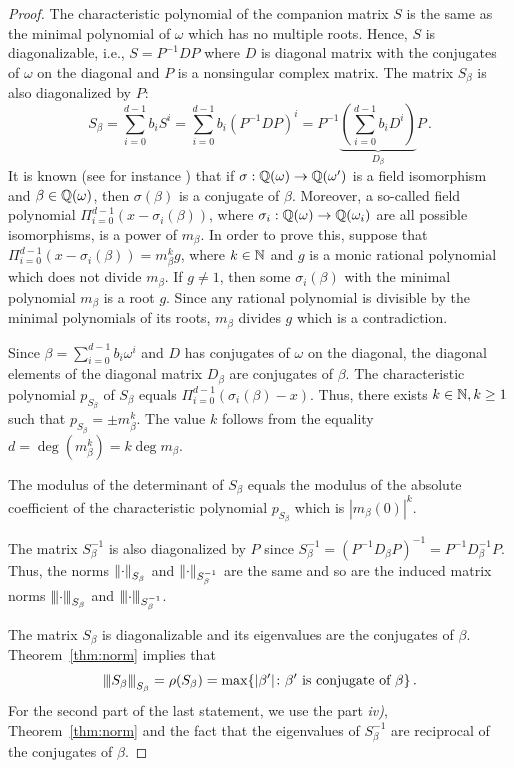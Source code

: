 \begin{proof}
The characteristic polynomial of the companion matrix $S$ is the same as the minimal polynomial of $\omega$ which has no multiple roots. Hence, $S$ is diagonalizable, i.e., $S=P^{-1}DP$ where $D$ is diagonal matrix with the conjugates of $\omega$ on the diagonal and $P$ is a nonsingular complex matrix. The matrix $S_\beta$ is also diagonalized by $P$:
$$
S_\beta=\sum_{i=0}^{d-1} b_i S^i= \sum_{i=0}^{d-1} b_i \left(P^{-1}DP\right)^i=P^{-1}\underbrace{\left(\sum_{i=0}^{d-1} b_i D^i\right)}_{D_\beta}P\,.
$$
It is known (see for instance \cite{chapman}) that if $\sigma:\mathbb{Q}(\omega)\rightarrow\mathbb{Q}(\omega')$ is a field isomorphism and $\beta\in\mathbb{Q}(\omega)$, then $\sigma(\beta)$ is a conjugate of $\beta$. Moreover, a so-called field polynomial $\Pi_{i=0}^{d-1}(x-\sigma_i(\beta))$, where $\sigma_i:\mathbb{Q}(\omega)\rightarrow\mathbb{Q}(\omega_i)$ are all possible isomorphisms, is a power of $m_\beta$. In order to prove this, suppose that $\Pi_{i=0}^{d-1}(x-\sigma_i(\beta))=m_\beta^k g$, where $k\in\mathbb{N}$ and $g$ is a monic rational polynomial which does not divide $m_\beta$. If $g\neq 1$, then some $\sigma_i(\beta)$ with the minimal polynomial $m_\beta$ is a root $g$. Since any rational polynomial is divisible by the minimal polynomials of its roots, $m_\beta$ divides $g$ which is a contradiction.


Since $\beta=\sum_{i=0}^{d-1} b_i \omega^i$ and $D$ has conjugates of $\omega$ on the diagonal, the diagonal elements of the diagonal matrix $D_\beta$ are conjugates of $\beta$. The characteristic polynomial $p_{S_\beta}$ of $S_\beta$ equals $\Pi_{i=0}^{d-1}(\sigma_i(\beta)-x)$. Thus, there exists $k\in\mathbb{N}, k\geq 1$ such that $p_{S_\beta}=\pm m^k_\beta$. The value $k$ follows from the equality $d=\deg(m_\beta^k)=k \deg m_\beta$. 

The modulus of the determinant of $S_\beta$ equals the modulus of the absolute coefficient of the characteristic polynomial $p_{S_\beta}$ which is $|m_\beta(0)|^k$.

The matrix $S_\beta^{-1}$ is also diagonalized by $P$ since $S_\beta^{-1}=(P^{-1}D_\beta P)^{-1}=P^{-1}D_\beta^{-1}P$. Thus, the norms $\left\lVert\cdot\right\rVert_{S_\beta}$ and $\left\lVert\cdot\right\rVert_{S_\beta^{-1}}$ are the same and so are the induced matrix norms ${\left\vert\kern-0.25ex\left\vert\kern-0.25ex\left\vert \cdot\right\vert\kern-0.25ex\right\vert\kern-0.25ex\right\vert}_{S_\beta}$ and ${\left\vert\kern-0.25ex\left\vert\kern-0.25ex\left\vert \cdot\right\vert\kern-0.25ex\right\vert\kern-0.25ex\right\vert}_{S_\beta^{-1}}$.

The matrix $S_\beta$ is diagonalizable and its eigenvalues are the conjugates of $\beta$. Theorem~\ref{thm:norm} implies that 
$$
{\left\vert\kern-0.25ex\left\vert\kern-0.25ex\left\vert S_\beta\right\vert\kern-0.25ex\right\vert\kern-0.25ex\right\vert}_{S_\beta}=\rho(S_\beta)= \max \{|\beta'| \colon \beta' \text{ is conjugate of } \beta\}\,. 
$$
For the second part of the last statement, we use the part \textit{iv)}, Theorem~\ref{thm:norm} and the fact that the eigenvalues of $S_\beta^{-1}$ are  reciprocal of the conjugates of $\beta$.
\end{proof}

